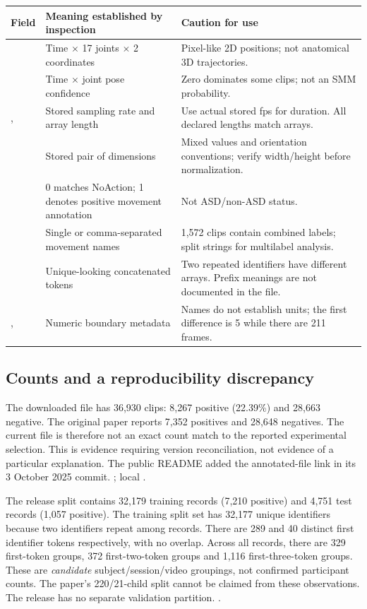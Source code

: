 \begin{longtable}{@{}P{.24\linewidth}P{.31\linewidth}P{.38\linewidth}@{}}\toprule
Field & Meaning established by inspection & Caution for use\\\midrule\endhead
{} & Time $\times$ 17 joints $\times$ 2 coordinates & Pixel-like 2D positions; not anatomical 3D trajectories.\\
 & Time $\times$ joint pose confidence & Zero dominates some clips; not an SMM probability.\\
,  & Stored sampling rate and array length & Use actual stored fps for duration. All declared lengths match arrays.\\
 & Stored pair of dimensions & Mixed values and orientation conventions; verify width/height before normalization.\\
 & 0 matches NoAction; 1 denotes positive movement annotation & Not ASD/non-ASD status.\\
 & Single or comma-separated movement names & 1,572 clips contain combined labels; split strings for multilabel analysis.\\
 & Unique-looking concatenated tokens & Two repeated identifiers have different arrays. Prefix meanings are not documented in the file.\\
,  & Numeric boundary metadata & Names do not establish units; the first difference is 5 while there are 211 frames.\\\bottomrule
\end{longtable}

\subsection{Counts and a reproducibility discrepancy}
The downloaded file has 36,930 clips: 8,267 positive (22.39\%) and 28,663 negative. The original paper reports 7,352 positives and 28,648 negatives. The current file is therefore not an exact count match to the reported experimental selection. This is evidence requiring version reconciliation, not evidence of a particular explanation. The public README added the annotated-file link in its 3 October 2025 commit. \cite{repo,barami2024}; local .

The release split contains 32,179 training records (7,210 positive) and 4,751 test records (1,057 positive). The training split set has 32,177 unique identifiers because two identifiers repeat among records. There are 289 and 40 distinct first identifier tokens respectively, with no overlap. Across all records, there are 329 first-token groups, 372 first-two-token groups and 1,116 first-three-token groups. These are \emph{candidate} subject/session/video groupings, not confirmed participant counts. The paper's 220/21-child split cannot be claimed from these observations. The release has no separate validation partition. .

